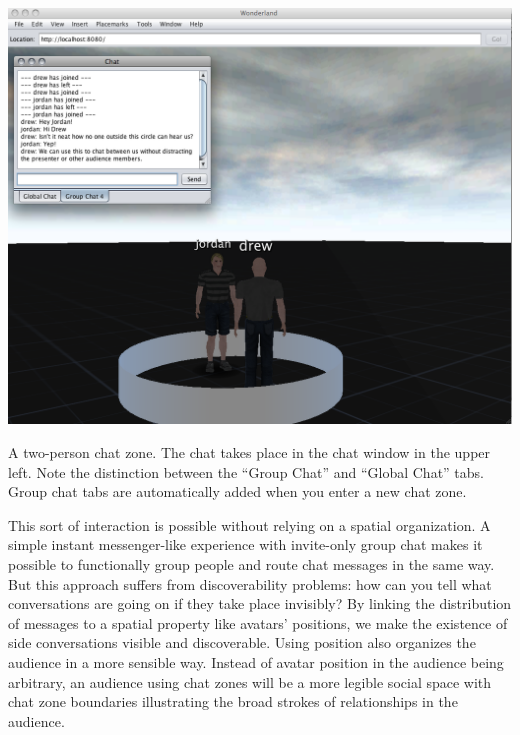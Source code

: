 \begin{marginfigure}
	\includegraphics{figures/chat-zones.png}
	\caption{A two-person chat zone. The chat takes place in the chat window in the upper left. Note the distinction between the ``Group Chat'' and ``Global Chat'' tabs. Group chat tabs are automatically added when you enter a new chat zone.}
	\label{fig:chat_zones}
\end{marginfigure}

This sort of interaction is possible without relying on a spatial organization. A simple instant messenger-like experience with invite-only group chat makes it possible to functionally group people and route chat messages in the same way. But this approach suffers from discoverability problems: how can you tell what conversations are going on if they take place invisibly? By linking the distribution of messages to a spatial property like avatars' positions, we make the existence of side conversations visible and discoverable. Using position also organizes the audience in a more sensible way. Instead of avatar position in the audience being arbitrary, an audience using chat zones will be a more legible social space with chat zone boundaries illustrating the broad strokes of relationships in the audience. 



